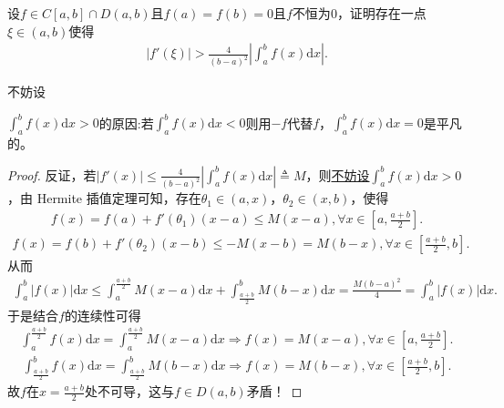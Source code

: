 \documentclass[../../main.tex]{subfiles}
\begin{document}
\begin{example}
设\(f \in C[a,b]\cap D(a,b)\)且\(f(a) = f(b) = 0\)且\(f\)不恒为\(0\)，证明存在一点\(\xi \in (a,b)\)使得
\begin{align*}
|f'(\xi)| > \frac{4}{(b - a)^2}\left|\int_{a}^{b}f(x)\mathrm{d}x\right|.
\end{align*} 
\end{example}
\begin{remark}
\hypertarget{example0.5----:不妨设的原因}{不妨设}\(\int_{a}^{b}f(x)\mathrm{d}x > 0\)的原因:若\(\int_{a}^{b}f(x)\mathrm{d}x < 0\)则用\(-f\)代替\(f\)，\(\int_{a}^{b}f(x)\mathrm{d}x = 0\)是平凡的。
\end{remark}
\begin{proof}
反证，若\(|f'(x)| \leqslant \frac{4}{(b - a)^2}\left|\int_{a}^{b}f(x)\mathrm{d}x\right| \triangleq M\)，则\hyperlink{example0.5----:不妨设的原因}{不妨设\(\int_{a}^{b}f(x)\mathrm{d}x > 0\)}，由 Hermite 插值定理可知，存在\(\theta_1 \in (a, x)\)，\(\theta_2 \in (x, b)\)，使得
\begin{align*}
f(x) = f(a) + f'(\theta_1)(x - a) \leqslant M(x - a), \forall x \in \left[a, \frac{a + b}{2}\right].
\end{align*}
\begin{align*}
f(x) = f(b) + f'(\theta_2)(x - b) \leqslant -M(x - b) = M(b - x), \forall x \in \left[\frac{a + b}{2}, b\right].
\end{align*}
从而
\begin{align*}
\int_{a}^{b}|f(x)|\mathrm{d}x \leqslant \int_{a}^{\frac{a + b}{2}}M(x - a)\mathrm{d}x + \int_{\frac{a + b}{2}}^{b}M(b - x)\mathrm{d}x = \frac{M(b - a)^2}{4} = \int_{a}^{b}|f(x)|\mathrm{d}x.
\end{align*}
于是结合\(f\)的连续性可得
\begin{align*}
\int_{a}^{\frac{a + b}{2}}f(x)\mathrm{d}x = \int_{a}^{\frac{a + b}{2}}M(x - a)\mathrm{d}x \Rightarrow f(x) = M(x - a), \forall x \in \left[a, \frac{a + b}{2}\right].
\end{align*}
\begin{align*}
\int_{\frac{a + b}{2}}^{b}f(x)\mathrm{d}x = \int_{\frac{a + b}{2}}^{b}M(b - x)\mathrm{d}x \Rightarrow f(x) = M(b - x), \forall x \in \left[\frac{a + b}{2}, b\right].
\end{align*}
故\(f\)在\(x = \frac{a + b}{2}\)处不可导，这与\(f \in D(a, b)\)矛盾！
\end{proof}
\end{document}
